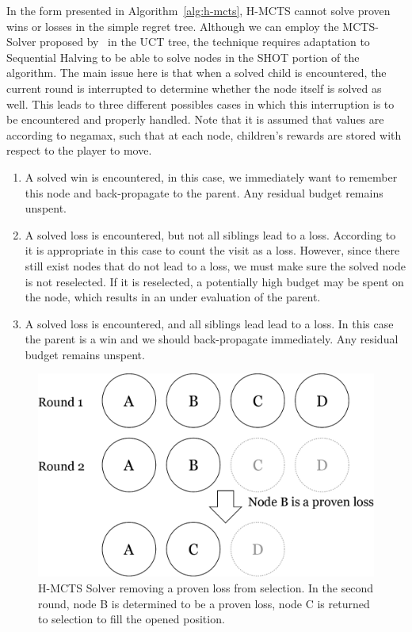 \documentclass{kecsmstr}
\begin{document}
In the form presented in Algorithm~\ref{alg:h-mcts}, H-MCTS cannot solve proven wins or losses in the simple regret tree. Although we can employ the MCTS-Solver proposed by~ in the UCT tree, the technique requires adaptation to Sequential Halving to be able to solve nodes in the SHOT portion of the algorithm. The main issue here is that when a solved child is encountered, the current round is interrupted to determine whether the node itself is solved as well. This leads to three different possibles cases in which this interruption is to be encountered and properly handled. Note that it is assumed that values are according to negamax, such that at each node, children's rewards are stored with respect to the player to move.
\begin{enumerate}
\item A solved win is encountered, in this case, we immediately want to remember this node and back-propagate to the parent. Any residual budget remains unspent.
\item A solved loss is encountered, but not all siblings lead to a loss. According to~ it is appropriate in this case to count the visit as a loss. However, since there still exist nodes that do not lead to a loss, we must make sure the solved node is not reselected. If it is reselected, a potentially high budget may be spent on the node, which results in an under evaluation of the parent.
\item A solved loss is encountered, and all siblings lead lead to a loss. In this case the parent is a win and we should back-propagate immediately. Any residual budget remains unspent.
\end{enumerate}
\begin{figure}[b]
	\centering
	\includegraphics[width=.6\textwidth]{img/solver.png}
	\caption{H-MCTS Solver removing a proven loss from selection. In the second round, node B is determined to be a proven loss, node C is returned to selection to fill the opened position.}
	\label{fig:h-mcts_solver}
\end{figure}
\end{document}
